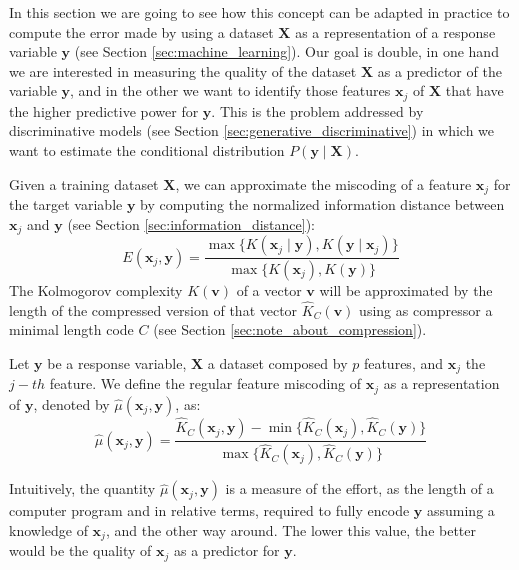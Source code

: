 In this section we are going to see how this concept can be adapted in practice to compute the error made by using a dataset $\mathbf{X}$ as a representation of a response variable $\mathbf{y}$ (see Section \ref{sec:machine_learning}). Our goal is double, in one hand we are interested in measuring the quality of the dataset $\mathbf{X}$ as a predictor of the variable $\mathbf{y}$, and in the other we want to identify those features $\mathbf{x}_j$ of $\mathbf{X}$ that have the higher predictive power for $\mathbf{y}$. This is the problem addressed by discriminative models (see Section \ref{sec:generative_discriminative}) in which we want to estimate the conditional distribution $P( \mathbf{y} \mid \mathbf{X} )$.

Given a training dataset $\mathbf{X}$, we can approximate the miscoding of a feature $\mathbf{x}_j$ for the target variable $\mathbf{y}$ by computing the normalized information distance between $\mathbf{x}_j$ and $\mathbf{y}$ (see Section \ref{sec:information_distance}):
\[
E(\mathbf{x}_j, \mathbf{y}) = \frac{\max\{ K(\mathbf{x}_j \mid \mathbf{y}), K(\mathbf{y} \mid \mathbf{x}_j) \}}{\max \{ K(\mathbf{x}_j), K(\mathbf{y}) \} }
\]
The Kolmogorov complexity $K(\mathbf{v})$ of a vector $\mathbf{v}$ will be approximated by the length of the compressed version of that vector $\hat{K}_C(\mathbf{v})$ using as compressor a minimal length code $C$ (see Section \ref{sec:note_about_compression}).

\begin{definition}
Let $\mathbf{y}$ be a response variable, $\mathbf{X}$ a dataset composed by $p$ features, and $\mathbf{x}_j$ the $j-th$ feature. We define the regular feature miscoding of $\mathbf{x}_j$ as a representation of $\mathbf{y}$, denoted by $\hat\mu(\mathbf{x}_j, \mathbf{y})$, as:
\[
\hat\mu(\mathbf{x}_j, \mathbf{y}) = \frac{ \hat{K}_C(\mathbf{x}_j, \mathbf{y}) - \min\{ \hat{K}_C(\mathbf{x}_j), \hat{K}_C(\mathbf{y}) \} } { \max\{ \hat{K}_C(\mathbf{x}_j), \hat{K}_C(\mathbf{y}) \} }
\]\end{definition}

Intuitively, the quantity $\hat\mu(\mathbf{x}_j, \mathbf{y})$ is a measure of the effort, as the length of a computer program and in relative terms, required to fully encode $\mathbf{y}$ assuming a knowledge of $\mathbf{x}_j$, and the other way around. The lower this value, the better would be the quality of $\mathbf{x}_j$ as a predictor for $\mathbf{y}$.

